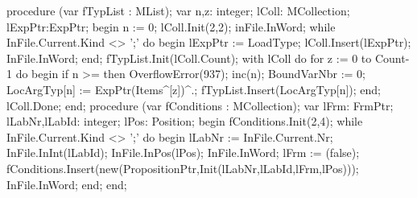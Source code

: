 procedure (var fTypList : MList);
var
   n,z: integer;
   lColl: MCollection;
   lExpPtr:ExpPtr;
begin
   n := 0;
   lColl.Init(2,2);
   inFile.InWord;
   while InFile.Current.Kind <> ';' do
   begin
      lExpPtr := LoadType;
      lColl.Insert(lExpPtr);
      InFile.InWord;
   end;
   fTypList.Init(lColl.Count);
   with lColl do
      for z := 0 to Count-1 do
      begin
         if n >=  then OverflowError(937);
         inc(n);
         BoundVarNbr := 0;
         LocArgTyp[n] := ExpPtr(Items^[z])^.;
         fTypList.Insert(LocArgTyp[n]);
      end;
   lColl.Done;
end;
\eatline
{}\nwendcode{}\nwdocspar
\nwenddocs{}\endmoddef\nwstartdeflinemarkup{}\nwenddeflinemarkup
procedure (var fConditions : MCollection);
var
   lFrm: FrmPtr;
   lLabNr,lLabId: integer;
   lPos: Position;
begin
   fConditions.Init(2,4);
   while InFile.Current.Kind <> ';' do
   begin
      lLabNr := InFile.Current.Nr;
      InFile.InInt(lLabId);
      InFile.InPos(lPos);
      InFile.InWord;
      lFrm := (false);
      fConditions.Insert(new(PropositionPtr,Init(lLabNr,lLabId,lFrm,lPos)));
      InFile.InWord;
   end;
end;
\eatline
{}\nwendcode{}\nwdocspar
